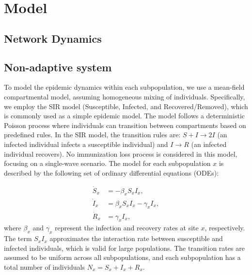 
% 
\section{Model}
\subsection{Network Dynamics}

\subsection{Non-adaptive system}
To model the epidemic dynamics within each subpopulation, we use a mean-field compartmental model, assuming homogeneous mixing of individuals. Specifically, we employ the SIR model (Susceptible, Infected, and Recovered/Removed), which is commonly used as a simple epidemic model. The model follows a deterministic Poisson process where individuals can transition between compartments based on predefined rules. In the SIR model, the transition rules are: \( S + I \rightarrow 2I \) (an infected individual infects a susceptible individual) and \( I \rightarrow R \) (an infected individual recovers). No immunization loss process is considered in this model, focusing on a single-wave scenario. The model for each subpopulation \( x \) is described by the following set of ordinary differential equations (ODEs):

\begin{equation}
\begin{aligned}
    \dot{S}_{x} &= -\beta_{x} S_{x} I_{x}, \\
    \dot{I}_{x} &= \beta_{x} S_{x} I_{x} - \gamma_{x} I_{x}, \\
    \dot{R}_{x} &= \gamma_{x} I_{x},
\end{aligned}
\end{equation}
where \( \beta_x \) and \( \gamma_x \) represent the infection and recovery rates at site \( x \), respectively. The term \( S_x I_x \) approximates the interaction rate between susceptible and infected individuals, which is valid for large populations. The transition rates are assumed to be uniform across all subpopulations, and each subpopulation has a total number of individuals \( N_x = S_x + I_x + R_x \).\\

